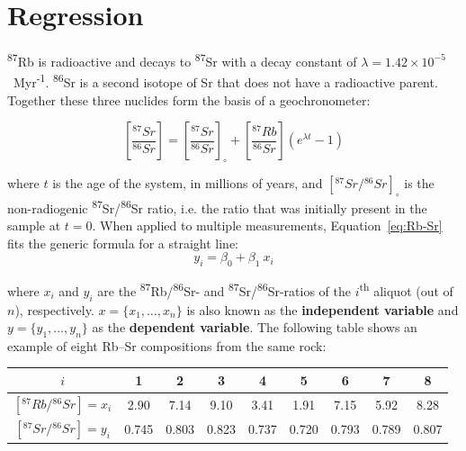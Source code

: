\chapter{Regression}
\label{ch:regression}

\textsuperscript{87}Rb is radioactive and decays to
\textsuperscript{87}Sr with a decay constant of
$\lambda=1.42\times{10}^{-5}$~Myr\textsuperscript{-1}.
\textsuperscript{86}Sr is a second isotope of Sr that does not have a
radioactive parent. Together these three nuclides form the basis of a
geochronometer:

\begin{equation}
  \left[\frac{{}^{87}Sr}{{}^{86}Sr}\right] =
  \left[\frac{{}^{87}Sr}{{}^{86}Sr}\right]_\circ +
  \left[\frac{{}^{87}Rb}{{}^{86}Sr}\right]
  \left(e^{\lambda{t}}-1\right)
  \label{eq:Rb-Sr}
\end{equation}

\noindent where $t$ is the age of the system, in millions of years,
and $[{}^{87}Sr/{}^{86}Sr]_\circ$ is the non-radiogenic
\textsuperscript{87}Sr/\textsuperscript{86}Sr ratio, i.e. the ratio
that was initially present in the sample at $t=0$. When applied to
multiple measurements, Equation~\ref{eq:Rb-Sr} fits the generic
formula for a straight line:
\begin{equation}
  y_i = \beta_0 + \beta_1~x_i
  \label{eq:y=a+bx}
\end{equation}

where $x_i$ and $y_i$ are the
\textsuperscript{87}Rb/\textsuperscript{86}Sr- and
\textsuperscript{87}Sr/\textsuperscript{86}Sr-ratios of the
$i$\textsuperscript{th} aliquot (out of $n$), respectively.
$x=\{x_1,\ldots,x_n\}$ is also known as the \textbf{independent
  variable} and $y=\{y_1,\ldots,y_n\}$ as the \textbf{dependent
  variable}. The following table shows an example of eight Rb--Sr
compositions from the same rock:

\begin{center}
  \begin{tabular}{c|cccccccc}
    $i$ & 1 & 2 & 3 & 4 & 5 & 6 & 7 & 8 \\ \hline
    $[{}^{87}Rb/{}^{86}Sr] = x_i$ & 2.90 & 7.14 & 9.10 &
    3.41 & 1.91 & 7.15 & 5.92 & 8.28 \\
    $[{}^{87}Sr/{}^{86}Sr] = y_i$ & 0.745 & 0.803 & 0.823 & 0.737 &
    0.720 & 0.793 & 0.789 & 0.807
  \end{tabular}
  \label{tab:Rb-Sr}
\end{center}

